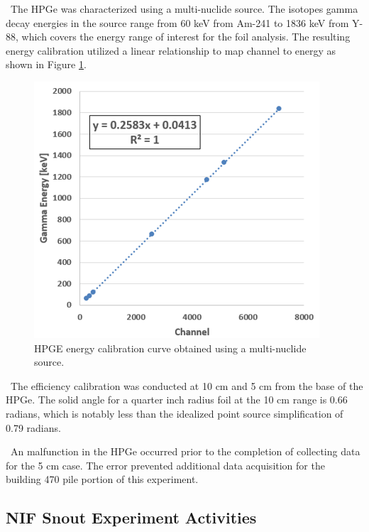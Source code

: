 \documentclass[journal]{IEEEtran}
\let\MYoriglatexcaption\caption
\renewcommand{\caption}[2][\relax]{\MYoriglatexcaption[#2]{#2}}
\begin{document}
	\ The HPGe was characterized using a multi-nuclide source. 
The isotopes gamma decay energies in the source range from 60 keV from Am-241 to 1836 keV from Y-88, which covers the energy range of interest for the foil analysis. 
The resulting energy calibration utilized a linear relationship to map channel to energy as shown in Figure \ref{fig:ecal}. 
	
	\begin{figure}[h]
		\includegraphics[width=\linewidth]{Figures/ECal.png}
		\caption{HPGE energy calibration curve obtained using a multi-nuclide source.}
		\label{fig:ecal}
	\end{figure}
	
	\ The efficiency calibration was conducted at 10 cm and 5 cm from the base of the HPGe. 
The solid angle for a quarter inch radius foil at the 10 cm range is 0.66 radians, which is notably less than the idealized point source simplification of 0.79 radians. 
	
	\ An malfunction in the HPGe occurred prior to the completion of collecting data for the 5 cm case. 
The error prevented additional data acquisition for the building 470 pile portion of this experiment.
	
	\subsection{NIF Snout Experiment Activities}
	  
\end{document}
